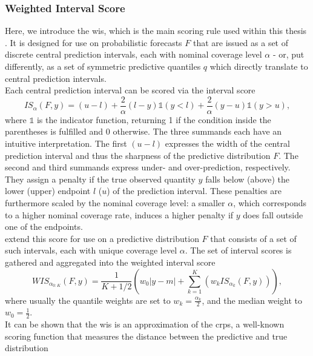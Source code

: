 \subsubsection{Weighted Interval Score}
Here, we introduce the \ac{wis}, which is the main scoring rule used within this thesis \cite{bracher_evaluating_2021}. It is designed for use on probabilistic forecasts \cite{european_covid-19_forecast_hub_european_2021} $F$ that are issued as a set of discrete central prediction intervals, each with nominal coverage level $\alpha$ - or, put differently, as a set of symmetric predictive quantiles $q$ which directly translate to central prediction intervals. \\
Each central prediction interval can be scored via the interval score \citep{gneiting_strictly_2007}
\begin{equation}
IS_{\alpha}(F, y) = (u-l) + \frac{2}{\alpha}(l - y)\mathbb{1}(y < l) + \frac{2}{\alpha}(y - u)\mathbb{1}(y > u),
\end{equation}
where $\mathbb{1}$ is the indicator function, returning 1 if the condition inside the parentheses is fulfilled and 0 otherwise. The three summands each have an intuitive interpretation. The first $(u-l)$ expresses the width of the central prediction interval and thus the sharpness of the predictive distribution $F$. The second and third summands express under- and over-prediction, respectively. They assign a penalty if the true observed quantity $y$ falls below (above) the lower (upper) endpoint $l$ ($u$) of the prediction interval. These penalties are furthermore scaled by the nominal coverage level: a smaller $\alpha$, which corresponds to a higher nominal coverage rate, induces a higher penalty if $y$ does fall outside one of the endpoints. \\
\cite{bracher_evaluating_2021} extend this score for use on a predictive distribution $F$ that consists of a set of such intervals, each with unique coverage level $\alpha$. The set of interval scores is gathered and aggregated into the weighted interval score
\begin{equation}
WIS_{\alpha_{0:K}}(F,y) = \frac{1}{K + 1/2}\left(w_{0}|y-m| + \sum_{k=1}^{K}\left(w_k IS_{\alpha_{k}}(F, y)\right)\right),
\end{equation}
where usually the quantile weights are set to $w_k = \frac{\alpha_{k}}{2}$, and the median weight to $w_{0} = \frac{1}{2}$.\\
It can be shown that the \ac{wis} is an approximation of the \ac{crps}, a well-known scoring function that measures the distance between the predictive and true distribution 
